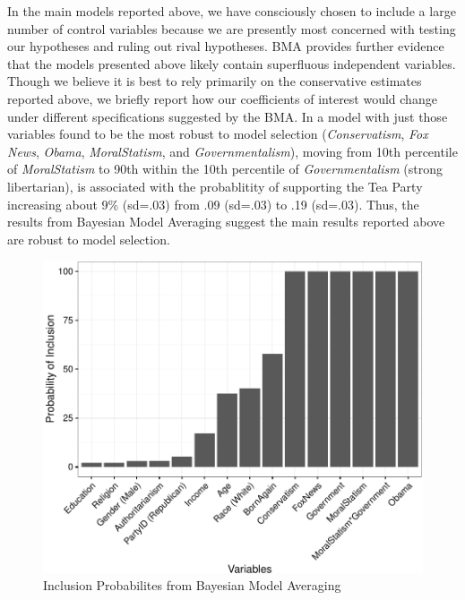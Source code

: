 \documentclass[12pt,]{article}
\begin{document}
In the main models reported above, we have consciously chosen to include
a large number of control variables because we are presently most
concerned with testing our hypotheses and ruling out rival hypotheses.
BMA provides further evidence that the models presented above likely
contain superfluous independent variables. Though we believe it is best
to rely primarily on the conservative estimates reported above, we
briefly report how our coefficients of interest would change under
different specifications suggested by the BMA. In a model with just
those variables found to be the most robust to model selection
(\emph{Conservatism}, \emph{Fox News}, \emph{Obama},
\emph{MoralStatism}, and \emph{Governmentalism}), moving from 10th
percentile of \emph{MoralStatism} to 90th within the 10th percentile of
\emph{Governmentalism} (strong libertarian), is associated with the
probablitity of supporting the Tea Party increasing about 9\% (sd=.03)
from .09 (sd=.03) to .19 (sd=.03). Thus, the results from Bayesian Model
Averaging suggest the main results reported above are robust to model
selection.

\begin{figure}[htbp]
\centering
\includegraphics{figures/bma2-1.pdf}
\caption{Inclusion Probabilites from Bayesian Model Averaging}
\end{figure}

\clearpage
\end{document}
